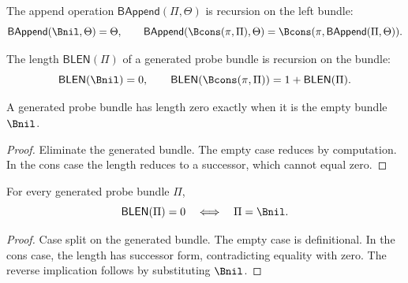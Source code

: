 
\begin{definition}
\label{def:bundle-append}
The append operation $\mathsf{BAppend}(\Pi,\Theta)$ is recursion on the left bundle:
$$
\mathsf{BAppend}(\Bnil,\Theta)=\Theta,
\qquad
\mathsf{BAppend}(\Bcons(\pi,\Pi),\Theta)
=\Bcons(\pi,\mathsf{BAppend}(\Pi,\Theta)).
$$
\end{definition}

\begin{definition}
\label{def:bundle-length}
The length $\mathsf{BLEN}(\Pi)$ of a generated probe bundle is recursion on the bundle:
$$
\mathsf{BLEN}(\Bnil)=0,
\qquad
\mathsf{BLEN}(\Bcons(\pi,\Pi))=1+\mathsf{BLEN}(\Pi).
$$
\end{definition}

\begin{theorem}
\label{thm:probe-bundle-length-zero-iff-nil}
A generated probe bundle has length zero exactly when it is the empty bundle
$\Bnil$.
\end{theorem}
\begin{proof}
Eliminate the generated bundle. The empty case reduces by computation. In the
cons case the length reduces to a successor, which cannot equal zero.
\end{proof}

\begin{lemma}
\label{lem:probe-bundle-length-zero-iff-empty}
For every generated probe bundle $\Pi$,
$$
\mathsf{BLEN}(\Pi)=0
\quad\Longleftrightarrow\quad
\Pi=\Bnil.
$$
\end{lemma}
\begin{proof}
Case split on the generated bundle. The empty case is definitional. In the cons
case, the length has successor form, contradicting equality with zero. The
reverse implication follows by substituting $\Bnil$.
\end{proof}

